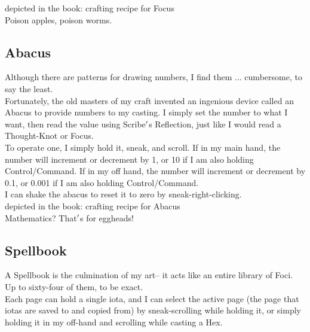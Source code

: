 \documentclass[12pt]{article}
\begin{document}
  
  depicted in the book: crafting recipe for 
    Focus
\\

      Poison apples, poison worms.\\


\newpage

\label{sec:items/abacus}
\subsection*{Abacus}


  
    Although there are patterns for drawing numbers, I find them ... cumbersome, to say the least.\\Fortunately, the old masters of my craft invented an ingenious device called an Abacus to provide numbers to my casting. I simply set the number to what I want, then read the value using Scribe$\rq$s Reflection, just like I would read a Thought-Knot or Focus.\\


  
    To operate one, I simply hold it, sneak, and scroll. If in my main hand, the number will increment or decrement by 1, or 10 if I am also holding Control/Command. If in my off hand, the number will increment or decrement by 0.1, or 0.001 if I am also holding Control/Command.\\I can shake the abacus to reset it to zero by sneak-right-clicking.\\


  
  depicted in the book: crafting recipe for 
    Abacus
\\

      Mathematics? That$\rq$s for eggheads!\\


\newpage

\label{sec:items/spellbook}
\subsection*{Spellbook}


  
    A Spellbook is the culmination of my art-- it acts like an entire library of Foci. Up to sixty-four of them, to be exact.\\Each page can hold a single iota, and I can select the active page (the page that iotas are saved to and copied from) by sneak-scrolling while holding it, or simply holding it in my off-hand and scrolling while casting a Hex.\\
\end{document}
